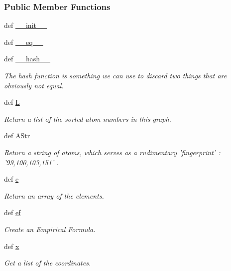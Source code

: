 \subsubsection*{Public Member Functions}
\begin{DoxyCompactItemize}
\item 
def \hyperlink{classforcebalance_1_1molecule_1_1MyG_a15e0af39012f78688d87e538999275aa}{\-\_\-\-\_\-init\-\_\-\-\_\-}
\item 
def \hyperlink{classforcebalance_1_1molecule_1_1MyG_a0d5915cec6b8fe13a23b50f5c1edc10a}{\-\_\-\-\_\-eq\-\_\-\-\_\-}
\item 
def \hyperlink{classforcebalance_1_1molecule_1_1MyG_a5ae5e64f229f7833216a82969fa39b15}{\-\_\-\-\_\-hash\-\_\-\-\_\-}
\begin{DoxyCompactList}\small\item\em The hash function is something we can use to discard two things that are obviously not equal. \end{DoxyCompactList}\item 
def \hyperlink{classforcebalance_1_1molecule_1_1MyG_a2a5ae00cf603aa8d887d4dcca8412834}{L}
\begin{DoxyCompactList}\small\item\em Return a list of the sorted atom numbers in this graph. \end{DoxyCompactList}\item 
def \hyperlink{classforcebalance_1_1molecule_1_1MyG_a56413ce7a4c8db075299f724bd9ad71f}{A\-Str}
\begin{DoxyCompactList}\small\item\em Return a string of atoms, which serves as a rudimentary 'fingerprint' \-: '99,100,103,151' . \end{DoxyCompactList}\item 
def \hyperlink{classforcebalance_1_1molecule_1_1MyG_a2913983e3a4725dff2df4a39f30bfaad}{e}
\begin{DoxyCompactList}\small\item\em Return an array of the elements. \end{DoxyCompactList}\item 
def \hyperlink{classforcebalance_1_1molecule_1_1MyG_ab6c0598bb829c52b68aaa9c189211419}{ef}
\begin{DoxyCompactList}\small\item\em Create an Empirical Formula. \end{DoxyCompactList}\item 
def \hyperlink{classforcebalance_1_1molecule_1_1MyG_a2fff1521f1d651835fe56f64340a7ddf}{x}
\begin{DoxyCompactList}\small\item\em Get a list of the coordinates. \end{DoxyCompactList}\end{DoxyCompactItemize}
